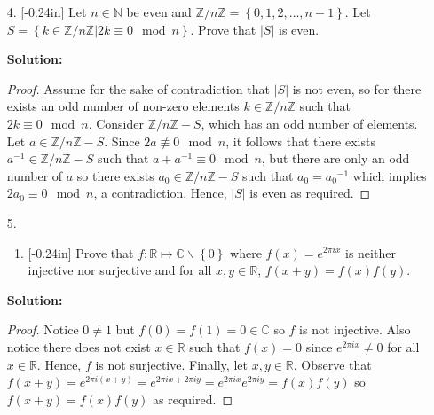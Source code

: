\documentclass[letterpaper,12pt]{article}
\newcommand{\set}[1]{\left\{ #1 \right\}}
\theoremstyle{definition}
\begin{document}
\pagebreak
\begin{enumerate}
    \item[4.]\reversemarginpar{}[-0.24in] Let $n \in \mathbb{N}$ be even and $\mathbb{Z} / n\mathbb{Z} = \set{0,1,2,\ldots,n-1}$. Let $S = \set{k \in \mathbb{Z} / n\mathbb{Z}  | 2k \equiv 0 \mod n }$. Prove that $|S|$ is even.
     \begin{mdframed}
            \textbf{Solution:}
            \begin{proof}
                Assume for the sake of contradiction that $|S|$ is not even, so for there exists an odd number of non-zero elements $k \in \mathbb{Z}/n\mathbb{Z}$ such that $2k \equiv 0 \mod n$. Consider $\mathbb{Z} / n\mathbb{Z}-S$, which has an odd number of elements. Let $a \in \mathbb{Z} / n\mathbb{Z}-S$. Since $2a \not \equiv 0 \mod n$, it follows that there exists $a^{-1} \in \mathbb{Z} / n\mathbb{Z}-S$ such that $a + a^{-1} \equiv 0 \mod n$, but there are only an odd number of $a$ so there exists $a_0 \in \mathbb{Z} / n\mathbb{Z}-S $ such that $a_0 = {a_0}^{-1}$ which implies $2a_0 \equiv 0 \mod n$, a contradiction. Hence, $|S|$ is even as required.
            \end{proof}
        \end{mdframed}
\end{enumerate}
\pagebreak
\begin{enumerate}
    \item[5.] \begin{enumerate} \item \reversemarginpar{}[-0.24in] Prove that $f: \mathbb{R} \mapsto \mathbb{C}\backslash \set{0}$ where $f(x) = e^{2\pi i x}$ is neither injective nor surjective and for all $x,y \in \mathbb{R}$, $f(x+y) = f(x)f(y)$. \end{enumerate}
     \begin{mdframed}
            \textbf{Solution:}
            \begin{proof}
                Notice $0 \neq 1$ but $f(0) = f(1) = 0 \in \mathbb{C}$ so $f$ is not injective. Also notice there does not exist $x \in \mathbb{R}$ such that $f(x) = 0$ since $e^{2\pi i x} \neq 0$ for all $x \in \mathbb{R}$. Hence, $f$ is not surjective. Finally, let $x,y \in \mathbb{R}$. Observe that $f(x+y) = e^{2\pi i (x+y)} = e^{2\pi i x + 2\pi i y} = e^{2\pi i x} e^{2\pi i y} = f(x)f(y)$ so $f(x+y) = f(x)f(y)$ as required.
            \end{proof}
        \end{mdframed}
\end{enumerate}
\end{document}
